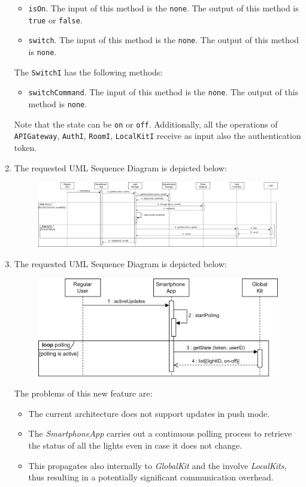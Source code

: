 \begin{enumerate}
        \begin{itemize} 
            \item \texttt{isOn}. 
                The input of this method is the \texttt{none}.
                The output of this method is \texttt{true} or \texttt{false}.
            \item \texttt{switch}. 
                The input of this method is the \texttt{none}.
                The output of this method is \texttt{none}.
        \end{itemize}
        The \texttt{SwitchI} has the following methods: 
        \begin{itemize} 
            \item \texttt{switchCommand}. 
                The input of this method is the \texttt{none}.
                The output of this method is \texttt{none}.
        \end{itemize}
        Note that the state can be \texttt{on} or \texttt{off}. 
        Additionally, all the operations of \texttt{APIGateway}, \texttt{AuthI}, \texttt{RoomI}, \texttt{LocalKitI} receive as input also the authentication token. 
    \item The requested UML Sequence Diagram is depicted below: 
        \begin{figure}[H]
            \centering
            \includegraphics[width=0.9\linewidth]{images/sd.png}
        \end{figure}
    \item The requested UML Sequence Diagram is depicted below: 
        \begin{figure}[H]
            \centering
            \includegraphics[width=0.8\linewidth]{images/sd1.png}
        \end{figure}
        The problems of this new feature are: 
        \begin{itemize}
            \item The current architecture does not support updates in push mode.
            \item The \textit{SmartphoneApp} carries out a continuous polling process to retrieve the status of all the lights even in case it does not change.
            \item This propagates also internally to \textit{GlobalKit} and the involve \textit{LocalKits}, thus resulting in a potentially significant communication overhead.
        \end{itemize}
\end{enumerate}